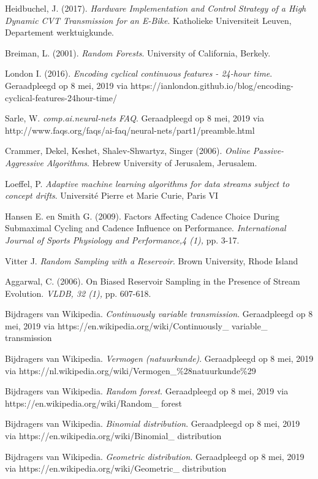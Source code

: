 \newpage
\begin{thebibliography}{9}
Heidbuchel, J. (2017).
\textit{Hardware Implementation and Control Strategy of a High Dynamic CVT Transmission for an E-Bike}.
Katholieke Universiteit Leuven,
Departement werktuigkunde.
 
Breiman, L. (2001).
\textit{Random Forests}.
University of California, Berkely.

London I. (2016).
\textit{Encoding cyclical continuous features - 24-hour time}. Geraadpleegd op 8 mei, 2019 via https://ianlondon.github.io/blog/encoding-cyclical-features-24hour-time/

Sarle, W. 
\textit{comp.ai.neural-nets FAQ}.
Geraadpleegd op 8 mei, 2019 via http://www.faqs.org/faqs/ai-faq/neural-nets/part1/preamble.html

Crammer, Dekel, Keshet, Shalev-Shwartyz, Singer (2006).
\textit{Online Passive-Aggressive Algorithms}.
Hebrew University of Jerusalem, Jerusalem.

Loeffel, P. 
\textit{Adaptive machine learning algorithms for data streams subject to concept drifts}. 
Université Pierre et Marie Curie, Paris VI

Hansen E. en Smith G. (2009).
Factors Affecting Cadence Choice During Submaximal Cycling and Cadence Influence on Performance.
\textit{International Journal of Sports Physiology and Performance,4 (1), }pp. 3-17.

Vitter J. 
\textit{Random Sampling with a Reservoir}. 
Brown University, Rhode Island

Aggarwal, C. (2006).
On Biased Reservoir Sampling in the Presence of Stream Evolution.
\textit{VLDB, 32 (1), }pp. 607-618.

Bijdragers van Wikipedia.
\textit{Continuously variable transmission}.
Geraadpleegd op 8 mei, 2019 via https://en.wikipedia.org/wiki/Continuously\_ variable\_ transmission

Bijdragers van Wikipedia.
\textit{Vermogen (natuurkunde)}.
Geraadpleegd op 8 mei, 2019 via https://nl.wikipedia.org/wiki/Vermogen\_\%28natuurkunde\%29

Bijdragers van Wikipedia.
\textit{Random forest}.
Geraadpleegd op 8 mei, 2019 via https://en.wikipedia.org/wiki/Random\_ forest

Bijdragers van Wikipedia.
\textit{Binomial distribution}.
Geraadpleegd op 8 mei, 2019 via https://en.wikipedia.org/wiki/Binomial\_ distribution

Bijdragers van Wikipedia.
\textit{Geometric distribution}.
Geraadpleegd op 8 mei, 2019 via https://en.wikipedia.org/wiki/Geometric\_ distribution

\end{thebibliography}
